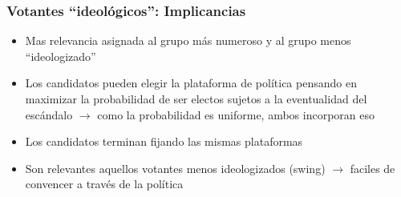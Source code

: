 \documentclass[14pt,aspectratio=169]{beamer}
\begin{document}
\begin{frame}\frametitle{Votantes ``ideológicos'': Implicancias}
\begin{itemize}
\item Mas relevancia asignada al grupo más numeroso y al grupo menos
  ``ideologizado''
  \item Los candidatos pueden elegir la plataforma de política
    pensando en maximizar la probabilidad de ser electos sujetos a la
    eventualidad del escándalo $\longrightarrow$ como la probabilidad
    es uniforme, ambos incorporan eso
  \item Los candidatos terminan fijando las mismas plataformas
    \item Son relevantes aquellos votantes menos ideologizados (swing) $\longrightarrow$ faciles de
      convencer a través de la política
               \end{itemize}
\end{frame}
\end{document}

